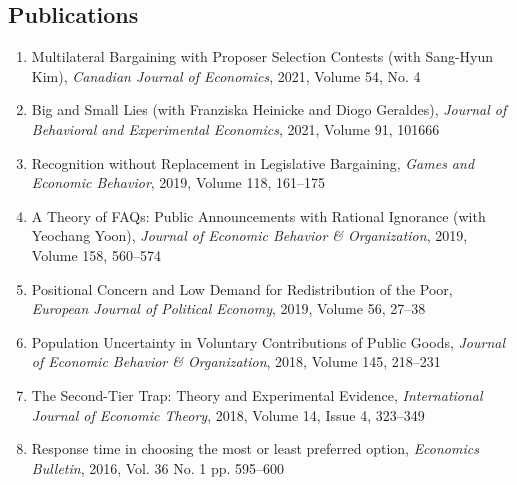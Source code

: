 \documentclass[margin, letterpaper]{res}
\begin{document}
\begin{resume}
\section{Publications}
\begin{enumerate}
\item Multilateral Bargaining with Proposer Selection Contests (with Sang-Hyun Kim), \emph{Canadian Journal of Economics}, 2021, Volume 54, No. 4
\item Big and Small Lies (with Franziska Heinicke and Diogo Geraldes), \emph{Journal of Behavioral and Experimental Economics}, 2021, Volume 91, 101666
\item Recognition without Replacement in Legislative Bargaining, \emph{Games and Economic Behavior}, 2019, Volume 118, 161--175
\item A Theory of FAQs: Public Announcements with Rational Ignorance (with Yeochang Yoon), \emph{Journal of Economic Behavior \& Organization}, 2019, Volume 158, 560--574
\item Positional Concern and Low Demand for Redistribution of the Poor, \emph{European Journal of Political Economy}, 2019, Volume 56, 27--38
\item Population Uncertainty in Voluntary Contributions of Public Goods, \emph{Journal of Economic Behavior \& Organization}, 2018, Volume 145, 218--231
\item The Second-Tier Trap: Theory and Experimental Evidence, \emph{International Journal of Economic Theory}, 2018, Volume 14, Issue 4, 323--349
\item Response time in choosing the most or least preferred option, \textit{Economics Bulletin}, 2016, Vol. 36 No. 1 pp. 595--600
\end{enumerate}


\end{resume}
\end{document}
